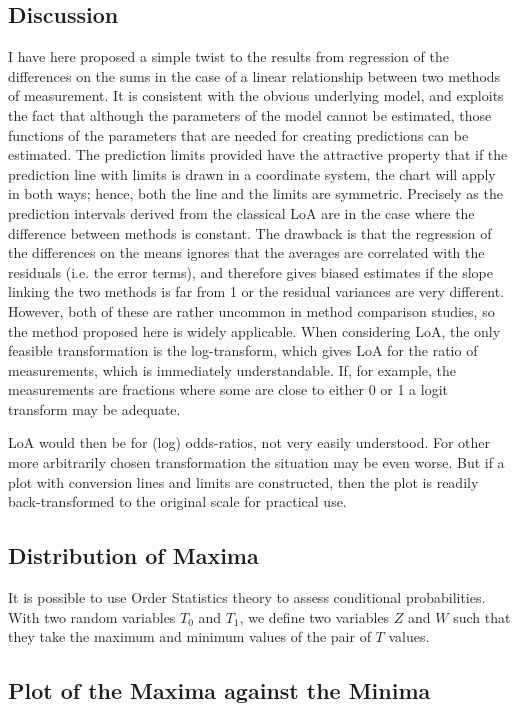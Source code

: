 \documentclass[Main.tex]{subfiles}
\begin{document}
\subsection{Discussion}
I have here proposed a simple twist to the results from regression of the differences on the sums in the case of a linear relationship
between two methods of measurement. It is consistent with the obvious underlying model, and exploits the fact that although
the parameters of the model cannot be estimated, those functions of the parameters that are needed for creating predictions
can be estimated.
The prediction limits provided have the attractive property that if the prediction line with limits is drawn in a coordinate
system, the chart will apply in both ways; hence, both the line and the limits are symmetric. Precisely as the prediction intervals
derived from the classical LoA are in the case where the difference between methods is constant.
The drawback is that the regression of the differences on the means ignores that the averages are correlated with the residuals
(i.e. the error terms), and therefore gives biased estimates if the slope linking the two methods is far from 1 or the residual
variances are very different. However, both of these are rather uncommon in method comparison studies, so the method proposed
here is widely applicable.
When considering LoA, the only feasible transformation is the log-transform, which gives LoA for the ratio of measurements,
which is immediately understandable. If, for example, the measurements are fractions where some are close to either 0 or 1 a
logit transform may be adequate. 

LoA would then be for (log) odds-ratios, not very easily understood. For other more arbitrarily
chosen transformation the situation may be even worse. But if a plot with conversion lines and limits are constructed, then the
plot is readily back-transformed to the original scale for practical use.

\subsection{Distribution of Maxima} It is possible to use Order
Statistics theory to assess conditional probabilities. With two
random variables $T_{0}$ and $T_{1}$, we define two variables $Z$
and $W$ such that they take the maximum and minimum values of the
pair of $T$ values.\subsection{Plot of the Maxima against the
	Minima}
\end{document}
